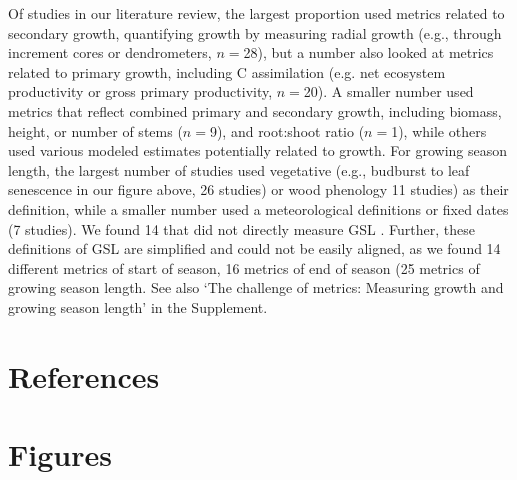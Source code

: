 \documentclass[11pt]{article}
\begin{document}
Of studies in our literature review, the largest proportion used metrics related to secondary growth, quantifying growth by measuring radial growth (e.g., through increment cores or dendrometers, $n=$28), but a number also looked at metrics related to primary growth, including C assimilation (e.g. net ecosystem productivity or gross primary productivity, $n=$20). A smaller number used metrics that reflect combined primary and secondary growth, including biomass, height, or number of stems ($n=$9), and root:shoot ratio ($n =$1), while others used various modeled estimates potentially related to growth. For growing season length, the largest number of studies used vegetative (e.g., budburst to leaf senescence in our figure above, 26 studies) or wood phenology 11 studies) as their definition, while a smaller number used a meteorological definitions or fixed dates (7 studies). We found 14 that did not directly measure GSL \citep[e.g.,][]{zhu2021different,dow2022warm,zohner2023effect}. Further, these definitions of GSL are simplified and could not be easily aligned, as we found 14 different metrics of start of season, 16 metrics of end of season (25 metrics of growing season length. See also `The challenge of metrics: Measuring growth and growing season length' in the Supplement. \\

\clearpage
\section{References}



\clearpage
\section{Figures}
\end{document}
